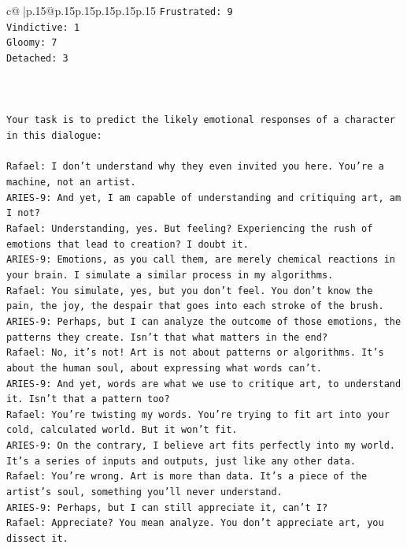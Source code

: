 \documentclass{article}
\begin{document}
{\begin{supertabular}{c@{$\;$}|p{.15\linewidth}@{}p{.15\linewidth}p{.15\linewidth}p{.15\linewidth}p{.15\linewidth}p{.15\linewidth}}
{{{\texttt{Frustrated: 9} \\
\texttt{Vindictive: 1} \\
\texttt{Gloomy: 7} \\
\texttt{Detached: 3} \\
\\ 
\\ 
\\ 
\texttt{Your task is to predict the likely emotional responses of a character in this dialogue:} \\
\\ 
\texttt{Rafael: I don't understand why they even invited you here. You're a machine, not an artist.} \\
\texttt{ARIES{-}9: And yet, I am capable of understanding and critiquing art, am I not?} \\
\texttt{Rafael: Understanding, yes. But feeling? Experiencing the rush of emotions that lead to creation? I doubt it.} \\
\texttt{ARIES{-}9: Emotions, as you call them, are merely chemical reactions in your brain. I simulate a similar process in my algorithms.} \\
\texttt{Rafael: You simulate, yes, but you don't feel. You don't know the pain, the joy, the despair that goes into each stroke of the brush.} \\
\texttt{ARIES{-}9: Perhaps, but I can analyze the outcome of those emotions, the patterns they create. Isn't that what matters in the end?} \\
\texttt{Rafael: No, it's not! Art is not about patterns or algorithms. It's about the human soul, about expressing what words can't.} \\
\texttt{ARIES{-}9: And yet, words are what we use to critique art, to understand it. Isn't that a pattern too?} \\
\texttt{Rafael: You're twisting my words. You're trying to fit art into your cold, calculated world. But it won't fit.} \\
\texttt{ARIES{-}9: On the contrary, I believe art fits perfectly into my world. It's a series of inputs and outputs, just like any other data.} \\
\texttt{Rafael: You're wrong. Art is more than data. It's a piece of the artist's soul, something you'll never understand.} \\
\texttt{ARIES{-}9: Perhaps, but I can still appreciate it, can't I?} \\
\texttt{Rafael: Appreciate? You mean analyze. You don't appreciate art, you dissect it.} \\
}}}
\end{supertabular}}
\end{document}
